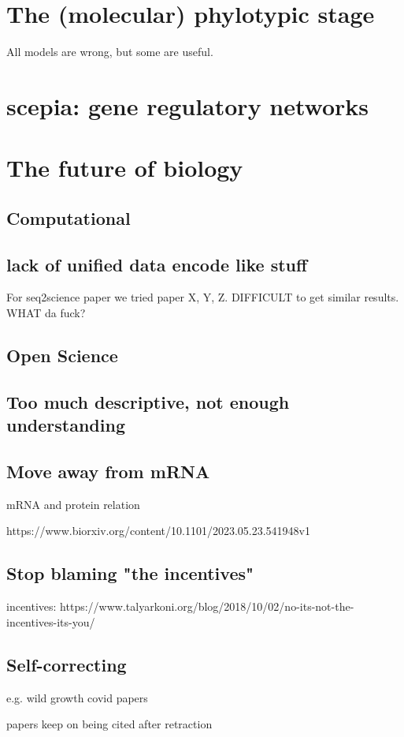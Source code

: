 \section{The (molecular) phylotypic stage}

All models are wrong, but some are useful. 

\section{scepia: gene regulatory networks}

\section{The future of biology}

\subsection{Computational}

\subsection{lack of unified data encode like stuff}

For seq2science paper we tried paper X, Y, Z. DIFFICULT to get similar results. WHAT da fuck?

% 

\subsection{Open Science}

\subsection{Too much descriptive, not enough understanding}

\subsection{Move away from mRNA}

mRNA and protein relation

https://www.biorxiv.org/content/10.1101/2023.05.23.541948v1

\subsection{Stop blaming "the incentives"}

incentives: https://www.talyarkoni.org/blog/2018/10/02/no-its-not-the-incentives-its-you/

\subsection{Self-correcting}

e.g. wild growth covid papers

papers keep on being cited after retraction

